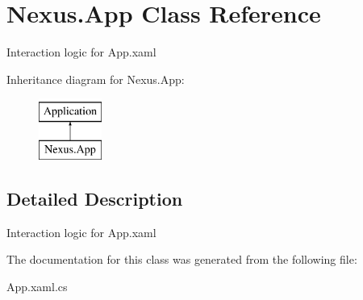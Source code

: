 \hypertarget{class_nexus_1_1_app}{}\section{Nexus.\+App Class Reference}
\label{class_nexus_1_1_app}


Interaction logic for App.\+xaml  


Inheritance diagram for Nexus.\+App\+:\begin{figure}[H]
\begin{center}
\leavevmode
\includegraphics[height=2.000000cm]{class_nexus_1_1_app}
\end{center}
\end{figure}


\subsection{Detailed Description}
Interaction logic for App.\+xaml 



The documentation for this class was generated from the following file\+:\begin{DoxyCompactItemize}
\item 
App.\+xaml.\+cs\end{DoxyCompactItemize}
